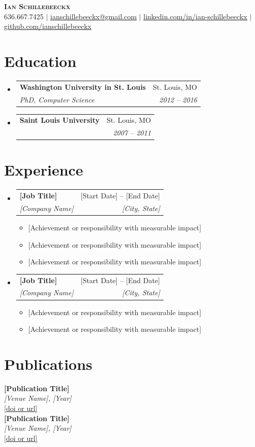 \documentclass[letterpaper,11pt]{article}
\makeatletter
\newcommand{\resumeItem}[1]{
  \item\small{
    {#1 \vspace{-2pt}}
  }
}
\newcommand{\resumeSubheading}[4]{
  \vspace{-2pt}\item
    \begin{tabular*}{0.97\textwidth}[t]{l@{\extracolsep{\fill}}r}
      \textbf{#1} & #2 \\
      \textit{\small#3} & \textit{\small #4} \\
    \end{tabular*}\vspace{-7pt}
}
\newcommand{\resumeSubHeadingListStart}{\begin{itemize}[leftmargin=0.15in, label={}]}
\newcommand{\resumeSubHeadingListEnd}{\end{itemize}}
\newcommand{\resumeItemListStart}{\begin{itemize}}
\newcommand{\resumeItemListEnd}{\end{itemize}\vspace{-5pt}}
\makeatother
\begin{document}
\begin{center}
    \textbf{\Huge \scshape Ian Schillebeeckx} \\ \vspace{1pt}
    \small 636.667.7425 $|$ \href{mailto:ianschillebeeckx@gmail.com}{\underline{ianschillebeeckx@gmail.com}} $|$
    \href{https://www.linkedin.com/in/ian-schillebeeckx/}{\underline{linkedin.com/in/ian-schillebeeckx}} $|$
    \href{https://github.com/ianschillebeeckx}{\underline{github.com/ianschillebeeckx}}
\end{center}


\section{Education}
  \resumeSubHeadingListStart
    \resumeSubheading
      {Washington University in St. Louis}{St. Louis, MO}
      {PhD, Computer Science}{2012 -- 2016}
    \resumeSubheading
      {Saint Louis University}{St. Louis, MO}
      {\parbox[t]{3.5in}{Honors BS, Computer Science \\ Honors BS, Applied Mathematics}}{2007 -- 2011}
  \resumeSubHeadingListEnd


\section{Experience}
  \resumeSubHeadingListStart

    \resumeSubheading
      {[Job Title]}{[Start Date] -- [End Date]}
      {[Company Name]}{[City, State]}
      \resumeItemListStart
        \resumeItem{[Achievement or responsibility with measurable impact]}
        \resumeItem{[Achievement or responsibility with measurable impact]}
        \resumeItem{[Achievement or responsibility with measurable impact]}
      \resumeItemListEnd

    \resumeSubheading
      {[Job Title]}{[Start Date] -- [End Date]}
      {[Company Name]}{[City, State]}
      \resumeItemListStart
        \resumeItem{[Achievement or responsibility with measurable impact]}
        \resumeItem{[Achievement or responsibility with measurable impact]}
      \resumeItemListEnd

  \resumeSubHeadingListEnd


\section{Publications}
 \begin{itemize}[leftmargin=0.15in, label={}]
    \small{\item{
     \textbf{[Publication Title]} \\ \emph{[Venue Name], [Year]} \\ \href{[URL]}{\underline{[doi or url]}} \\
     \vspace{3pt}
     \textbf{[Publication Title]} \\ \emph{[Venue Name], [Year]} \\ \href{[URL]}{\underline{[doi or url]}}
    }}
 \end{itemize}
\end{document}
